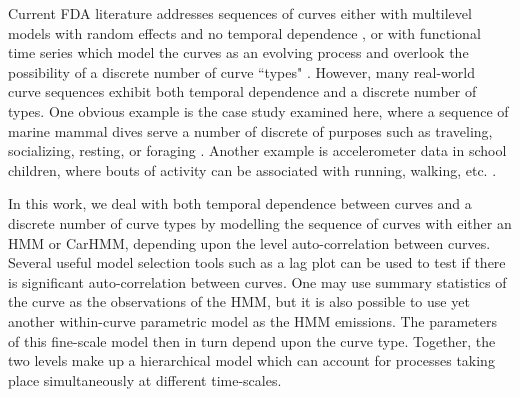 

Current FDA literature addresses sequences of curves either with multilevel models with random effects and no temporal dependence \citep{chen:2012,di:2009}, or with functional time series which model the curves as an evolving process and overlook the possibility of a discrete number of curve ``types" \citep{Kokoszka:2018}. However, many real-world curve sequences exhibit both temporal dependence and a discrete number of types. One obvious example is the case study examined here, where a sequence of marine mammal dives serve a number of discrete of purposes such as traveling, socializing, resting, or foraging \citep{Tennessen:2019a}. Another example is accelerometer data in school children, where bouts of activity can be associated with running, walking, etc. \citep{Morris:2007}.

In this work, we deal with both temporal dependence between curves and a discrete number of curve types by modelling the sequence of curves with either an HMM or CarHMM, depending upon the level auto-correlation between curves. Several useful model selection tools such as a lag plot can be used to test if there is significant auto-correlation between curves. One may use summary statistics of the curve as the observations of the HMM, but it is also possible to use yet another within-curve parametric model as the HMM emissions. The parameters of this fine-scale model then in turn depend upon the curve type. Together, the two levels make up a hierarchical model which can account for processes taking place simultaneously at different time-scales.



